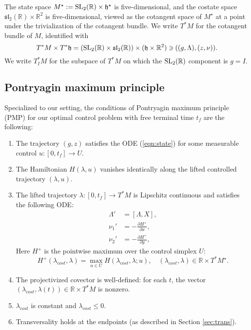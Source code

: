 \documentclass{article}
\theoremstyle{remark}
\newcommand{\ring}[1]{\mathbb{#1}}
\newcommand{\op}[1]{\hbox{#1}}
\def\sl{\mathfrak{sl}_2(\ring{R})}
\def\SL{\op{SL}_2(\ring{R})}
\def\h{\mathfrak h}
\def\hstar{{\mathfrak h}^\star}
\def\Mstar{M^\star}
\newcommand{\partials}[2]{\frac{\partial #1}{\partial #2}}
\begin{document}
The state space $\Mstar:=\SL\times \hstar$ is five-dimensional, and
  the costate space $\sl\times\ring{R}^2$ is five-dimensional,
viewed as the
cotangent space of $\Mstar$ at a point under the trivialization of the
cotangent bundle.  We write $T^*M$ for the cotangent bundle of $M$,
identified with
\[
T^*M\times T^*\h = (\SL\times\sl)\times (\h\times\ring{R}^2)
\ni((g,\Lambda),(z,\nu)).
\]
We write $T_I^*M$ for the subspace of $T^*M$ on which the $\SL$
component is $g=I$.

\subsection{Pontryagin maximum principle}\label{sec:pmp}

Specialized to our setting,
the conditions of Pontryagin maximum principle (PMP) for
our optimal control problem with free terminal time $t_f$ are
the following:
\begin{enumerate}
\item The trajectory $(g,z)$ satisfies the ODE
  (\ref{eqn:state}) for some measurable control $u:[0,t_f]\to U$.
\item The  Hamiltonian $H(\lambda,u)$ vanishes identically along the
  lifted controlled trajectory $(\lambda,u)$.  
\item The lifted trajectory $\lambda:[0,t_f]\to T^*M$ is Lipschitz continuous
  and satisfies the following ODE:
\begin{equation}\label{eqn:adjoint}
\begin{split}
\Lambda' &= [\Lambda,X],\\
\nu_1' &= -\partials{H^+}{x},\\
\nu_2' &= -\partials {H^+}{y},
\end{split}
\end{equation}
Here $H^+$ is the
  pointwise maximum over the control simplex $U$:
\begin{equation}\label{eqn:pmp-max}
H^+(\lambda_{cost},\lambda)=
\max_{u\in U} H(\lambda_{cost},\lambda;u),\quad 
(\lambda_{cost},\lambda)\in\ring{R}\times T^*\Mstar.
\end{equation}
\item The projectivized covector is well-defined: for each $t$, the
  vector $(\lambda_{cost},\lambda(t))\in\ring{R}\times T^*M$ is nonzero.
\item $\lambda_{cost}$ is constant and $\lambda_{cost}\le 0$.
\item Transversality holds at the endpoints (as described in
  Section \ref{sec:trans}).
\end{enumerate}
\end{document}
